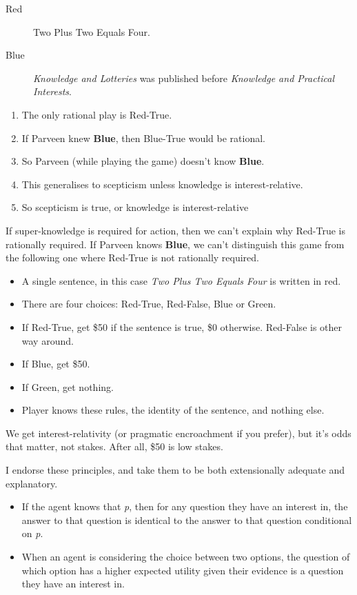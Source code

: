 \begin{description}
\item[Red] Two Plus Two Equals Four.
\item[Blue] \emph{Knowledge and Lotteries} was published before \emph{Knowledge and Practical Interests}.
\end{description}

\begin{enumerate}
\item The only rational play is Red-True.
\item If Parveen knew \textbf{Blue}, then Blue-True would be rational.
\item So Parveen (while playing the game) doesn't know \textbf{Blue}.
\item This generalises to scepticism unless knowledge is interest-relative.
\item So scepticism is true, or knowledge is interest-relative
\end{enumerate}
If super-knowledge is required for action, then we can't explain why Red-True is rationally required. If Parveen knows \textbf{Blue}, we can't distinguish this game from the following one where Red-True is not rationally required.

\begin{itemize}
\item A single sentence, in this case \textit{Two Plus Two Equals Four} is written in red.
\item There are four choices: Red-True, Red-False, Blue or Green.
\item If Red-True, get \$50 if the sentence is true, \$0 otherwise. Red-False is other way around.
\item If Blue, get \$50.
\item If Green, get nothing.
\item Player knows these rules, the identity of the sentence, and nothing else.
\end{itemize}
We get interest-relativity (or pragmatic encroachment if you prefer), but it's odds that matter, not stakes. After all, \$50 is low stakes. 

\pagebreak
\noindent I endorse these principles, and take them to be both extensionally adequate and explanatory.

\begin{itemize}
\item If the agent knows that \emph{p}, then for any question they have an interest in, the answer to that question is identical to the answer to that question conditional on \emph{p}.

\item When an agent is considering the choice between two options, the question of which option has a higher expected utility given their evidence is a question they have an interest in.

\end{itemize}

